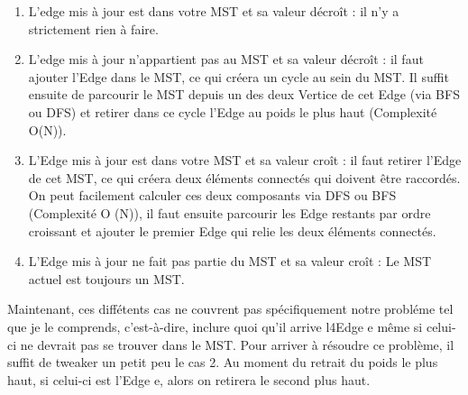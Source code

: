 \documentclass[11pt]{article}
\begin{document}
\begin{enumerate}
	\begin{enumerate}
	
	\item L’edge mis à jour est dans votre MST et sa valeur décroît : il n’y a strictement rien à faire.
	\item L’edge mis à jour n’appartient pas au MST et sa valeur décroît : il faut ajouter l’Edge dans le MST, ce qui créera un 		cycle au sein du MST. Il suffit ensuite de parcourir le MST depuis un des deux Vertice de cet Edge (via BFS ou DFS) et 			retirer dans ce cycle l’Edge au poids le plus haut (Complexité O(N)).
	\item L’Edge mis à jour est dans votre MST et sa valeur croît : il faut retirer  l’Edge de cet MST, ce qui créera deux 			éléments connectés qui doivent être raccordés. On peut facilement calculer ces deux composants via DFS ou BFS (Complexité O		(N)), il faut ensuite parcourir les Edge restants par ordre croissant et ajouter le premier Edge qui relie les deux 			éléments connectés.
	\item L’Edge mis à jour ne fait pas partie du MST et sa valeur croît : Le MST actuel est toujours un MST.
	
	\end{enumerate}

Maintenant, ces diffétents cas ne couvrent pas spécifiquement notre probléme tel que je le comprends, c’est-à-dire, inclure quoi qu’il arrive l4Edge e même si celui-ci ne devrait pas se trouver dans le MST. Pour arriver à résoudre ce problème, il suffit de tweaker un petit peu le cas 2. Au moment du retrait du poids le plus haut, si celui-ci est l’Edge e, alors on retirera le second plus haut.\\



\end{enumerate}
\end{document}

